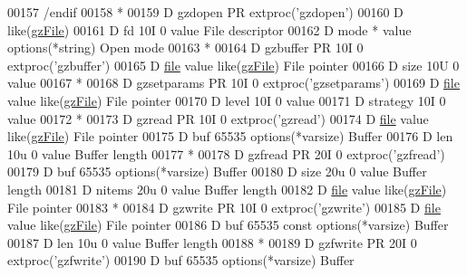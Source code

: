 \begin{DoxyCode}
00157       /endif
00158       *
00159      D gzdopen         PR                  extproc('gzdopen')
00160      D                                     like(\hyperlink{structgz_file__s}{gzFile})
00161      D  fd                           10I 0 value                                File descriptor
00162      D  mode                           *   value options(*\textcolor{keywordtype}{string})               Open mode
00163       *
00164      D gzbuffer        PR            10I 0 extproc('gzbuffer')
00165      D  \hyperlink{structfile}{file}                               value like(\hyperlink{structgz_file__s}{gzFile})                   File pointer
00166      D  size                         10U 0 value
00167       *
00168      D gzsetparams     PR            10I 0 extproc('gzsetparams')
00169      D  \hyperlink{structfile}{file}                               value like(\hyperlink{structgz_file__s}{gzFile})                   File pointer
00170      D  level                        10I 0 value
00171      D  strategy                     10I 0 value
00172       *
00173      D gzread          PR            10I 0 extproc('gzread')
00174      D  \hyperlink{structfile}{file}                               value like(\hyperlink{structgz_file__s}{gzFile})                   File pointer
00175      D  buf                       65535    options(*varsize)                    Buffer
00176      D  len                          10u 0 value                                Buffer length
00177       *
00178      D gzfread          PR           20I 0 extproc('gzfread')
00179      D  buf                       65535    options(*varsize)                    Buffer
00180      D  size                         20u 0 value                                Buffer length
00181      D  nitems                       20u 0 value                                Buffer length
00182      D  \hyperlink{structfile}{file}                               value like(\hyperlink{structgz_file__s}{gzFile})                   File pointer
00183       *
00184      D gzwrite         PR            10I 0 extproc('gzwrite')
00185      D  \hyperlink{structfile}{file}                               value like(\hyperlink{structgz_file__s}{gzFile})                   File pointer
00186      D  buf                       65535    const options(*varsize)              Buffer
00187      D  len                          10u 0 value                                Buffer length
00188       *
00189      D gzfwrite         PR           20I 0 extproc('gzfwrite')
00190      D  buf                       65535    options(*varsize)                    Buffer

\end{DoxyCode}
